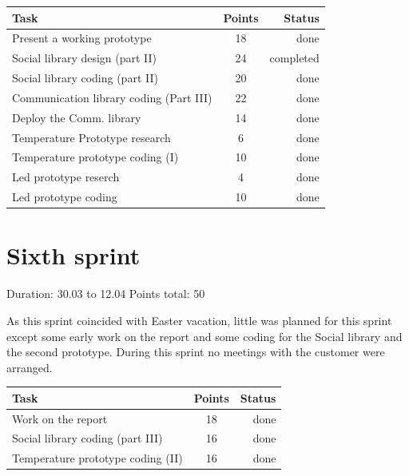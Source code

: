 \begin{table}[ht!]
\begin{tabular}{ | l | c | r | }

\hline
\textbf{Task} & \textbf{Points} & \textbf{Status} \\
\hline

Present a working prototype				& 18 & done \\
\hline
Social library design (part II)			& 24 & completed \\
\hline
Social library coding (part II)			& 20 & done \\
\hline
Communication library coding (Part III)	& 22 & done \\
\hline
Deploy the Comm. library				& 14 & done \\
\hline
Temperature Prototype research			& 6  & done \\
\hline
Temperature prototype coding (I)		& 10 & done \\
\hline
Led prototype reserch					& 4  & done \\
\hline
Led prototype coding					& 10 & done \\
\hline

\end{tabular}
\end{table}

\newpage

\section{Sixth sprint}

Duration: 30.03 to 12.04
Points total: 50

As this sprint coincided with Easter vacation, little
was planned for this sprint except some early work on the report
and some coding for the Social library and the second prototype.
During this sprint no meetings with the customer were arranged.

\begin{table}[ht!]
\begin{tabular}{ | l | c | r | }

\hline
\textbf{Task} & \textbf{Points} & \textbf{Status} \\
\hline

Work on the report					& 18 & done \\
\hline
Social library coding (part III)	& 16 & done \\
\hline
Temperature prototype coding (II)	& 16 & done \\
\hline

\end{tabular}
\end{table}

